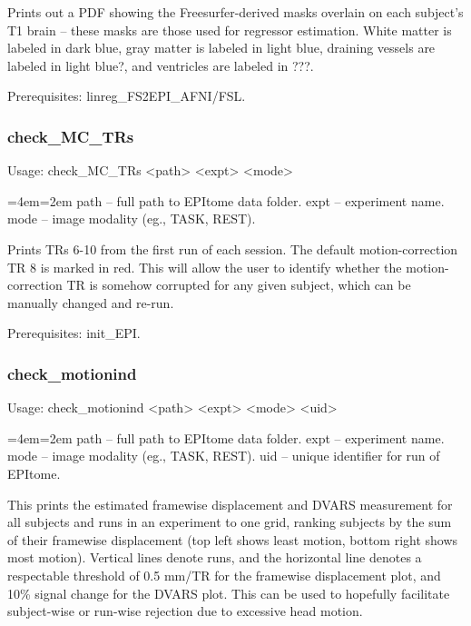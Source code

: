 \documentclass[final,titlepage,letterpaper,oneside,12pt]{article}
\renewcommand{\texttt}[2][BrickRed]{\textcolor{#1}{\ttfamily #2}}%
\newenvironment{blockquote}{%
  \par%
  \medskip
  \leftskip=4em\rightskip=2em%
  \noindent\ignorespaces}{%
  \par\medskip}
\begin{document}
\noindent Prints out a PDF showing the Freesurfer-derived masks overlain on each subject's T1 brain -- these masks are those used for regressor estimation. White matter is labeled in dark blue, gray matter is labeled in light blue, draining vessels are labeled in light blue?, and ventricles are labeled in ???.  

Prerequisites: \texttt{linreg\_FS2EPI\_AFNI/FSL}.

\subsubsection{check\_MC\_TRs}
Usage: \texttt{check\_MC\_TRs <path> <expt> <mode>}

\begin{blockquote}
path -- full path to EPItome data folder.
expt -- experiment name.
mode -- image modality (eg., TASK, REST).
\end{blockquote}

\noindent Prints TRs 6-10 from the first run of each session. The default motion-correction TR 8 is marked in red. This will allow the user to identify whether the motion-correction TR is somehow corrupted for any given subject, which can be manually changed and re-run.

Prerequisites: \texttt{init\_EPI}.

\subsubsection{check\_motionind}
Usage: \texttt{check\_motionind <path> <expt> <mode> <uid>}

\begin{blockquote}
path -- full path to EPItome data folder.
expt -- experiment name.
mode -- image modality (eg., TASK, REST).
uid -- unique identifier for run of EPItome.
\end{blockquote}

\noindent This prints the estimated framewise displacement and DVARS measurement for all subjects and runs in an experiment to one grid, ranking subjects by the sum of their framewise displacement (top left shows least motion, bottom right shows most motion). Vertical lines denote runs, and the horizontal line denotes a respectable threshold of 0.5 mm/TR for the framewise displacement plot, and 10\% signal change for the DVARS plot. This can be used to hopefully facilitate subject-wise or run-wise rejection due to excessive head motion.
\end{document}
